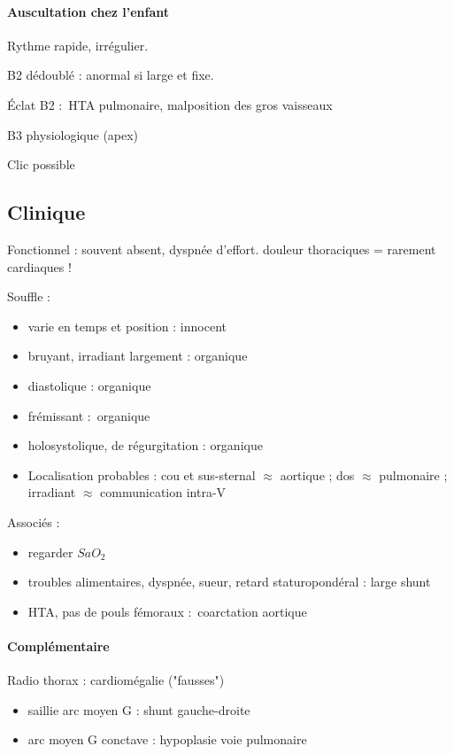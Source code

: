 \paragraph{Auscultation chez l'enfant} Rythme rapide, irrégulier.

B2 dédoublé : anormal si large et fixe.

Éclat B2 : HTA pulmonaire, malposition des gros vaisseaux

B3 physiologique (apex)

Clic possible

\subsection{Clinique}
Fonctionnel : souvent absent, dyspnée d'effort. \danger douleur thoraciques =
rarement cardiaques !

Souffle :
\begin{itemize}
  \item varie en temps et position : innocent
  \item bruyant, irradiant largement : organique
  \item diastolique : organique
  \item frémissant : organique
  \item holosystolique, de régurgitation : organique
  \item Localisation probables : cou et sus-sternal $\approx$ aortique ;
    dos $\approx$ pulmonaire ; irradiant $\approx$ 
    communication intra-V
\end{itemize}
Associés : 
\begin{itemize}
  \item regarder $SaO_2$
  \item troubles alimentaires, dyspnée, sueur, retard staturopondéral : large
    shunt
  \item HTA, pas de pouls fémoraux : coarctation aortique
\end{itemize}

\paragraph{Complémentaire}
Radio thorax : cardiomégalie (\danger "fausses")
\begin{itemize}
  \item saillie arc moyen G : shunt gauche-droite
  \item arc moyen G conctave : hypoplasie voie pulmonaire
\end{itemize}


